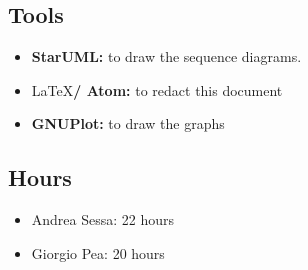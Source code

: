 \documentclass[11pt,titlepage]{article} %
\begin{document}
	\subsection{Tools}
		\begin{itemize}
			\item \textbf{StarUML:} to draw the sequence diagrams.
			\item \LaTeX \textbf{/ Atom:} to redact this document
			\item \textbf{GNUPlot:} to draw the graphs
		\end{itemize}

	\subsection{Hours}
		\begin{itemize}
			\item Andrea Sessa: 22 hours
			\item Giorgio Pea: 20 hours
		\end{itemize}
\end{document}

